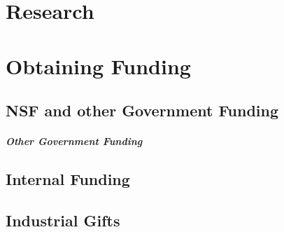 \documentclass[oneside,11pt]{memoir}
\begin{document}
\chapter{Research}
\chapter{Obtaining Funding}
\section{NSF and other Government Funding}

\paragraph{Other Government Funding}

\section{Internal Funding}

\section{Industrial Gifts}
\end{document}
